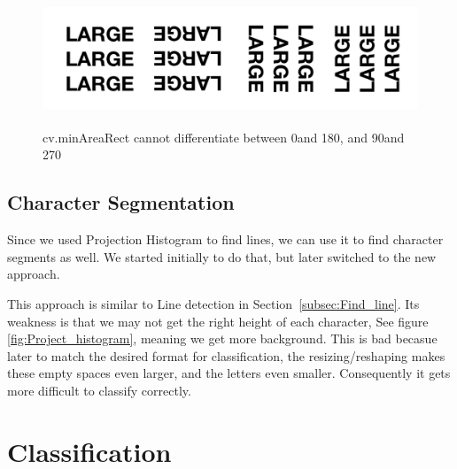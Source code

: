 \documentclass[Report.tex]{subfiles}
\begin{document}
\begin{flushleft}
    \begin{figure}[H]
      \centering
      \includegraphics[height=4cm]{res/4angle_rot.png}
      \caption{cv.minAreaRect cannot differentiate between 0\textdegree and 180\textdegree, and 90\textdegree and 270\textdegree}
      \label{fig:4angle_rot}
    \end{figure}

\end{flushleft}


\subsection{Character Segmentation}
\begin{flushleft}
Since we used Projection Histogram to find lines, we can use it to find character segments as well. We started initially to do that, but later switched to the new approach. \par
This approach is similar to Line detection in Section~\ref{subsec:Find_line}. Its weakness is that we may not get the right height of each character, See figure \ref{fig:Project_histogram}, meaning we get more background. This is bad becasue later to match the desired format for classification, the resizing/reshaping makes these empty spaces even larger, and the letters even smaller. Consequently it gets more difficult to classify correctly.
\end{flushleft}

\section{Classification}
\label{sec:Discarded Method:Classification}
\end{document}
